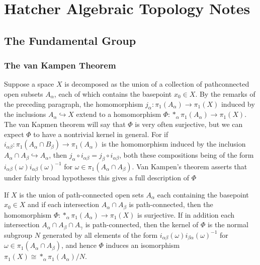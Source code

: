 \chapter{Hatcher Algebraic Topology Notes}
\section{The Fundamental Group}
\subsection{The van Kampen Theorem}
Suppose a space $X$ is decomposed as the union of a collection of
pathconnected open subsets $A_\alpha$, each of which contains the
basepoint $x_0\in X$. By the remarks of the preceding paragraph, the
homomorphism $j_\alpha\colon\pi_1(A_\alpha)\to\pi_1(X)$ induced by the
inclusions $A_\alpha\hookrightarrow X$ extend to a homomorphism
$\Phi\colon\ast_\alpha\pi_1(A_\alpha)\to\pi_1(X)$. The van Kapmen theorem
will say that $\Phi$ is very often surjective, but we can expect $\Phi$ to
have a nontrivial kernel in general. For if
$i_{\alpha\beta}\colon\pi_1(A_\alpha\cap B_\beta)\to\pi_1(A_\alpha)$ is the
homomorphism induced by the inclusion $A_\alpha\cap A_\beta\hookrightarrow
A_\alpha$, then $j_\alpha\circ i_{\alpha\beta}=j_\beta\circ
i_{\alpha\beta}$, both these compositions being of the form
$i_{\alpha\beta}(\omega)i_{\alpha\beta}(\omega)^{-1}$ for
$\omega\in\pi_1(A_\alpha\cap A_\beta)$. Van Kampen's theorem asserts that
under fairly broad hypotheses this gives a full description of $\Phi$
\begin{theorem}[Hatcher, 1.20, p.\@ 43]
If $X$ is the union of path-connected open sets $A_\alpha$ each containing
the basepoint $x_0\in X$ and if each intersection $A_\alpha\cap A_\beta$ is
path-connected, then the homomorphism
$\Phi\colon\ast_\alpha\pi_1(A_\alpha)\to\pi_1(X)$ is surjective. If in
addition each intersection $A_\alpha\cap A_\beta\cap A_\gamma$ is
path-connected, then the kernel of $\Phi$ is the normal subgroup $N$
generated by all elements of the form
$i_{\alpha\beta}(\omega)i_{\beta\alpha}(\omega)^{-1}$  for
$\omega\in\pi_1(A_\alpha\cap A_\beta)$, and hence $\Phi$ induces an
isomorphism $\pi_1(X)\cong\ast_\alpha\pi_1(A_\alpha)/N$.
\end{theorem}
